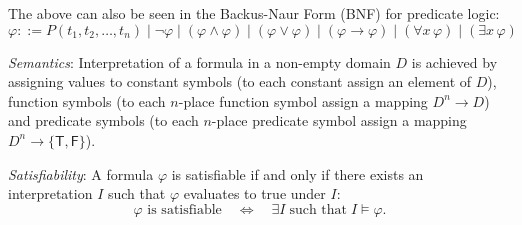 The above can also be seen in the Backus-Naur Form (BNF) for predicate logic:
\[
 \varphi ::= P(t_1, t_2, \ldots, t_n) 
 \mid \lnot \varphi 
 \mid (\varphi \land \varphi) 
 \mid (\varphi \lor \varphi) 
 \mid (\varphi \rightarrow \varphi) 
 \mid (\forall x\, \varphi) 
 \mid (\exists x\, \varphi)
\]

\vspace{0.5em}
\noindent \textit{Semantics}: Interpretation of a formula in a non-empty domain $D$ is achieved by assigning values to constant symbols (to each constant assign an element of $D$), function symbols (to each $n$-place function symbol assign a mapping $D^n \!\to\! D$) and predicate symbols (to each $n$-place predicate symbol assign a mapping $D^n \!\to\! \{\mathsf{T},\mathsf{F}\}$).

\vspace{0.5em}
\noindent \textit{Satisfiability}: A formula $\varphi$ is satisfiable if and only if there exists an interpretation $I$ such that $\varphi$ evaluates to true under $I$:
\[
 \varphi \text{ is satisfiable}
 \quad\Longleftrightarrow\quad
 \exists I \;\text{such that}\; I \models \varphi.
\]


